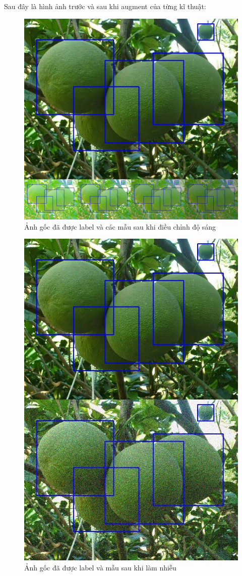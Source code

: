 Sau đây là hình ảnh trước và sau khi augment của từng kĩ thuật:
	\begin{center}
    	\begin{figure}[H]
    	\centering
    	\includegraphics[width=0.6\columnwidth]{images/chap3/twerkLight.jpg}
    	\caption{Ảnh gốc đã được label và các mẫu sau khi điều chỉnh độ sáng}
    	\label{fig:my_label}
    	\end{figure}
	\end{center}
	\begin{center}
    	\begin{figure}[H]
    	\centering
    	\includegraphics[width=0.4\columnwidth]{images/chap3/twerkNoise.jpg}
    	\caption{Ảnh gốc đã được label và mẫu sau khi làm nhiễu}
    	\label{fig:my_label}
    	\end{figure}
	\end{center}
